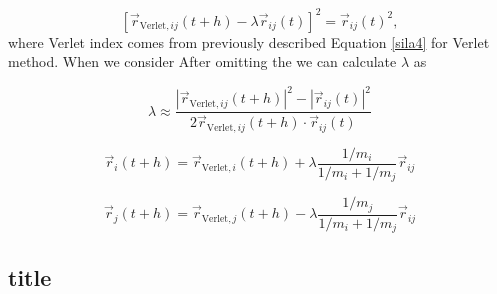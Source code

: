 \begin{equation}\label{SHAKE}
	[\vec{r}_{\text{Verlet},ij}(t + h)-\lambda\vec{r}_{ij}(t)]^2 = \vec{r}_{ij}(t)^2,
\end{equation}
where Verlet index comes from previously described Equation \ref{sila4} for Verlet method. When we consider After omitting the we can calculate $\lambda$ as

\begin{equation}\label{SHAKE_lamda}
	\lambda \approx \frac{|\vec{r}_{\text{Verlet},ij}(t + h)|^2 - |\vec{r}_{ij}(t)|^2}
	{2\vec{r}_{\text{Verlet},ij}(t + h) \cdot \vec{r}_{ij}(t)}
\end{equation}

\begin{equation}\label{SHAKE_lamdai}
	\vec{r}_i(t + h) = \vec{r}_{\text{Verlet},i}(t + h) + \lambda \frac{1/m_i}{ 1/m_i + 1/m_j} \vec{r}_{ij}
\end{equation}

\begin{equation}\label{SHAKE_lamdaj}
	\vec{r}_j(t + h) = \vec{r}_{\text{Verlet},j}(t + h) - \lambda \frac{1/m_j}{ 1/m_i + 1/m_j} \vec{r}_{ij}
\end{equation}

\subsection{title}
